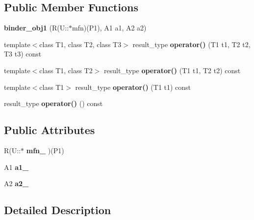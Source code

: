 \subsection*{Public Member Functions}
\begin{CompactItemize}
\item 
\textbf{binder\_\-obj1} (R(U::$\ast$mfn)(P1), A1 a1, A2 a2)\label{structam_1_1lambda_1_1binder__obj1_7bf6372d214724f9a9dafc24be8deaaa}

\item 
template$<$class T1, class T2, class T3$>$ result\_\-type \textbf{operator()} (T1 t1, T2 t2, T3 t3) const \label{structam_1_1lambda_1_1binder__obj1_0b3e492aeef424f851ad2dbce41a261e}

\item 
template$<$class T1, class T2$>$ result\_\-type \textbf{operator()} (T1 t1, T2 t2) const\label{structam_1_1lambda_1_1binder__obj1_3f083709255c7d1c3188d7fcaec38092}

\item 
template$<$class T1$>$ result\_\-type \textbf{operator()} (T1 t1) const \label{structam_1_1lambda_1_1binder__obj1_7bf3bcf64d9b939a666ddfe5d80183c6}

\item 
result\_\-type \textbf{operator()} () const\label{structam_1_1lambda_1_1binder__obj1_503e278a3618c3c947c4f746d411f2e9}

\end{CompactItemize}
\subsection*{Public Attributes}
\begin{CompactItemize}
\item 
R(U::$\ast$ \textbf{mfn\_\-} )(P1)\label{structam_1_1lambda_1_1binder__obj1_662b262de3c98023dfcf39536569440e}

\item 
A1 \textbf{a1\_\-}\label{structam_1_1lambda_1_1binder__obj1_a93ff0f1481333fe684726f0326fc022}

\item 
A2 \textbf{a2\_\-}\label{structam_1_1lambda_1_1binder__obj1_0cd05351917c0ecdb9126b1cbe1f1192}

\end{CompactItemize}


\subsection{Detailed Description}
